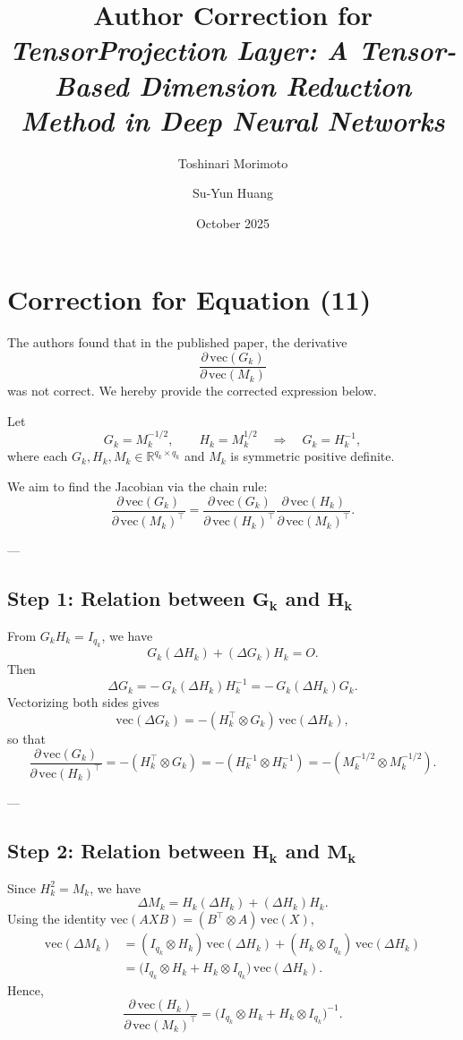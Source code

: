 \documentclass[10pt]{article}
\title{\textbf{Author Correction for}\\[3pt]
\emph{TensorProjection Layer: A Tensor-Based Dimension Reduction Method in Deep Neural Networks}}
\author{Toshinari Morimoto \and Su-Yun Huang}
\date{October 2025}
\begin{document}
\maketitle

\section*{Correction for Equation (11)}

The authors found that in the published paper, the derivative
\[
\frac{\partial\,\mathrm{vec}(G_k)}{\partial\,\mathrm{vec}(M_k)}
\]
was not correct.
We hereby provide the corrected expression below.

Let
\[
G_k = M_k^{-1/2}, \qquad 
H_k = M_k^{1/2} \quad \Rightarrow \quad G_k = H_k^{-1},
\]
where each $G_k, H_k, M_k \in \mathbb{R}^{q_k \times q_k}$ and $M_k$ is symmetric positive definite.

We aim to find the Jacobian via the chain rule:
\[
\frac{\partial\,\mathrm{vec}(G_k)}{\partial\,\mathrm{vec}(M_k)^{\!\top}}
=
\frac{\partial\,\mathrm{vec}(G_k)}{\partial\,\mathrm{vec}(H_k)^{\!\top}}
\frac{\partial\,\mathrm{vec}(H_k)}{\partial\,\mathrm{vec}(M_k)^{\!\top}}.
\]

---

\subsection*{Step 1: Relation between $\bm{G_k}$ and $\bm{H_k}$}

From $G_k H_k = I_{q_k}$, we have
\[
G_k(\Delta H_k) + (\Delta G_k)H_k = O.
\]
Then
\[
\Delta G_k = -\,G_k (\Delta H_k) H_k^{-1} = -\,G_k (\Delta H_k) G_k.
\]
Vectorizing both sides gives
\[
\mathrm{vec}(\Delta G_k)
= - (H_k^\top \otimes G_k)\,\mathrm{vec}(\Delta H_k),
\]
so that
\[
\frac{\partial\,\mathrm{vec}(G_k)}{\partial\,\mathrm{vec}(H_k)^{\!\top}}
= - (H_k^\top \otimes G_k)
= - (H_k^{-1} \otimes H_k^{-1})
= - (M_k^{-1/2} \otimes M_k^{-1/2}).
\tag{1}
\]

---

\subsection*{Step 2: Relation between $\bm{H_k}$ and $\bm{M_k}$}

Since $H_k^2 = M_k$, we have
\[
\Delta M_k = H_k (\Delta H_k) + (\Delta H_k) H_k.
\]
Using the identity $\mathrm{vec}(A X B) = (B^\top \otimes A)\,\mathrm{vec}(X)$,
\begin{align*}
\mathrm{vec}(\Delta M_k)
&= (I_{q_k} \otimes H_k)\,\mathrm{vec}(\Delta H_k)
  + (H_k \otimes I_{q_k})\,\mathrm{vec}(\Delta H_k) \\[1mm]
&= \bigl(I_{q_k} \otimes H_k + H_k \otimes I_{q_k}\bigr)\,\mathrm{vec}(\Delta H_k).
\end{align*}
Hence,
\[
\frac{\partial\,\mathrm{vec}(H_k)}{\partial\,\mathrm{vec}(M_k)^{\!\top}}
= \bigl(I_{q_k} \otimes H_k + H_k \otimes I_{q_k}\bigr)^{-1}.
\tag{2}
\]
\end{document}
